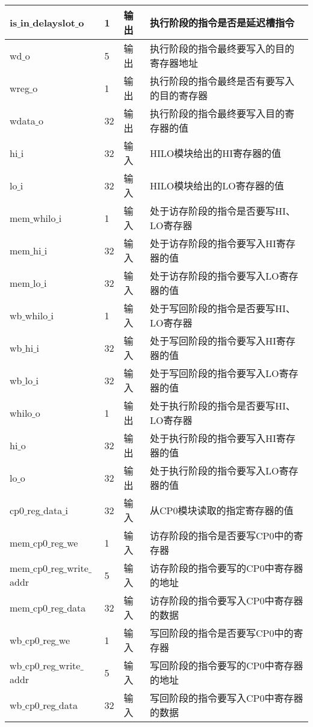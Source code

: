\begin{longtable}{|l|l|l|l|}
		\hline
		is$\_$in$\_$delayslot$\_$o & 1 & 输出 & 执行阶段的指令是否是延迟槽指令 \\
		\hline
		wd$\_$o & 5 & 输出 & 执行阶段的指令最终要写入的目的寄存器地址 \\
		\hline
		wreg$\_$o & 1 & 输出 & 执行阶段的指令最终是否有要写入的目的寄存器 \\
		\hline
		wdata$\_$o & 32 & 输出 & 执行阶段的指令最终要写入目的寄存器的值 \\
		\hline
		hi$\_$i & 32 & 输入 & HILO模块给出的HI寄存器的值 \\
		\hline
		lo$\_$i & 32 & 输入 & HILO模块给出的LO寄存器的值 \\
		\hline
		mem$\_$whilo$\_$i & 1 & 输入 & 处于访存阶段的指令是否要写HI、LO寄存器 \\
		\hline
		mem$\_$hi$\_$i & 32 & 输入 & 处于访存阶段的指令要写入HI寄存器的值 \\
		\hline
		mem$\_$lo$\_$i & 32 & 输入 & 处于访存阶段的指令要写入LO寄存器的值 \\
		\hline
		wb$\_$whilo$\_$i & 1 & 输入 & 处于写回阶段的指令是否要写HI、LO寄存器 \\
		\hline
		wb$\_$hi$\_$i & 32 & 输入 & 处于写回阶段的指令要写入HI寄存器的值 \\
		\hline
		wb$\_$lo$\_$i & 32 & 输入 & 处于写回阶段的指令要写入LO寄存器的值 \\
		\hline
		whilo$\_$o & 1 & 输出 & 处于执行阶段的指令是否要写HI、LO寄存器 \\
		\hline
		hi$\_$o & 32 & 输出 & 处于执行阶段的指令要写入HI寄存器的值 \\
		\hline
		lo$\_$o & 32 & 输出 & 处于执行阶段的指令要写入LO寄存器的值 \\
		\hline
		cp0$\_$reg$\_$data$\_$i & 32 & 输入 & 从CP0模块读取的指定寄存器的值 \\
		\hline
		mem$\_$cp0$\_$reg$\_$we & 1 & 输入 & 访存阶段的指令是否要写CP0中的寄存器 \\
		\hline
		mem$\_$cp0$\_$reg$\_$write$\_$addr & 5 & 输入 & 访存阶段的指令要写的CP0中寄存器的地址 \\
		\hline
		mem$\_$cp0$\_$reg$\_$data & 32 & 输入 & 访存阶段的指令要写入CP0中寄存器的数据 \\
		\hline
		wb$\_$cp0$\_$reg$\_$we & 1 & 输入 & 写回阶段的指令是否要写CP0中的寄存器 \\
		\hline
		wb$\_$cp0$\_$reg$\_$write$\_$addr & 5 & 输入 & 写回阶段的指令要写的CP0中寄存器的地址 \\
		\hline
		wb$\_$cp0$\_$reg$\_$data & 32 & 输入 & 写回阶段的指令要写入CP0中寄存器的数据 \\

\end{longtable}
